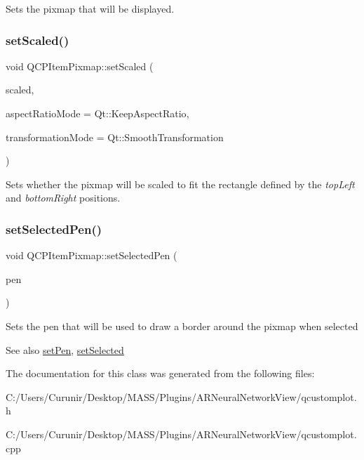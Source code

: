 Sets the pixmap that will be displayed. \mbox{\label{class_q_c_p_item_pixmap_ab4d44529a1c6c8d37d0ea7560e042777}} 
\subsubsection{\texorpdfstring{set\+Scaled()}{setScaled()}}
{\footnotesize\ttfamily void Q\+C\+P\+Item\+Pixmap\+::set\+Scaled (\begin{DoxyParamCaption}\item[{bool}]{scaled,  }\item[{Qt\+::\+Aspect\+Ratio\+Mode}]{aspect\+Ratio\+Mode = {\ttfamily Qt\+:\+:KeepAspectRatio},  }\item[{Qt\+::\+Transformation\+Mode}]{transformation\+Mode = {\ttfamily Qt\+:\+:SmoothTransformation} }\end{DoxyParamCaption})}

Sets whether the pixmap will be scaled to fit the rectangle defined by the {\itshape top\+Left} and {\itshape bottom\+Right} positions. \mbox{\label{class_q_c_p_item_pixmap_afc5e479e88e53740176ce77cb70dd67a}} 
\subsubsection{\texorpdfstring{set\+Selected\+Pen()}{setSelectedPen()}}
{\footnotesize\ttfamily void Q\+C\+P\+Item\+Pixmap\+::set\+Selected\+Pen (\begin{DoxyParamCaption}\item[{const Q\+Pen \&}]{pen }\end{DoxyParamCaption})}

Sets the pen that will be used to draw a border around the pixmap when selected

\begin{DoxySeeAlso}{See also}
\hyperlink{class_q_c_p_item_pixmap_acdade1305edb4b5cae14f97fd132065f}{set\+Pen}, \hyperlink{class_q_c_p_abstract_item_a203de94ad586cc44d16c9565f49d3378}{set\+Selected} 
\end{DoxySeeAlso}


The documentation for this class was generated from the following files\+:\begin{DoxyCompactItemize}
\item 
C\+:/\+Users/\+Curunir/\+Desktop/\+M\+A\+S\+S/\+Plugins/\+A\+R\+Neural\+Network\+View/qcustomplot.\+h\item 
C\+:/\+Users/\+Curunir/\+Desktop/\+M\+A\+S\+S/\+Plugins/\+A\+R\+Neural\+Network\+View/qcustomplot.\+cpp\end{DoxyCompactItemize}
